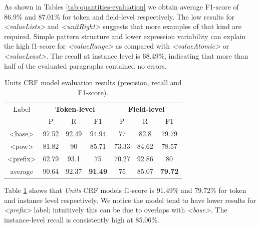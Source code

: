 \documentclass[sigplan, anonymous, review]{acmart}
\begin{document}
As shown in Tables \ref{tab:quantities-evaluation} we obtain average F1-score of 86.9\% and 87.01\% for token and field-level respectively. The low results for \textit{<valueLists>} and \textit{<unitRight>} suggests that more examples of that kind are required. Simple pattern structure and lower expression variability can explain the high f1-score for \textit{<valueRange>} as compared with \textit{<valueAtomic>} or \textit{<valueLeast>}. The recall at instance level is 68.49\%, indicating that more than half of the evaluated paragraphs contained no errors. 

\begin{table}[ht]
    \caption{Units CRF model evaluation results (precision, recall and F1-score).}
    \label{tab:units-evaluation}
    \begin{tabular}{c|ccc|ccc}
        \toprule
        Label & \multicolumn{3}{c}{\textbf{Token-level}} & \multicolumn{3}{c}{\textbf{Field-level}}\\
        & P & R & F1 & P & R & F1 \\
        \midrule
        <base>    & 97.52 & 92.49 & 94.94 & 77    & 82.8  & 79.79 \\
        <pow>     & 81.82 & 90    & 85.71 & 73.33 & 84.62 & 78.57 \\
        <prefix>  & 62.79 & 93.1  & 75    & 70.27 & 92.86 & 80    \\
        \midrule
        average   & 90.64  & 92.37 & \textbf{91.49} & 75   & 85.07 & \textbf{79.72} \\
        \bottomrule
   \end{tabular}
\end{table}

Table \ref{tab:units-evaluation} shows that \textit{Units} CRF models f1-score is 91.49\% and 79.72\% for token and instance level respectively. We notice the model tend to have lower results for \textit{<prefix>} label; intuitively this can be due to overlaps with \textit{<base>}. The instance-level recall is consistently high at 85.06\%. 
\end{document}
